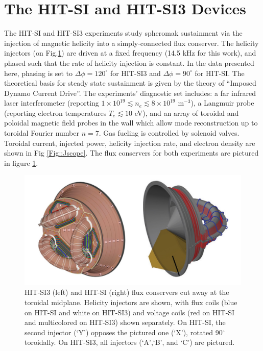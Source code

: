 \section{The HIT-SI and HIT-SI3 Devices}
\hspace{4ex}The HIT-SI\cite{sieck2005initial} and HIT-SI3\cite{Hossack_HitSi3} experiments study spheromak sustainment via the injection of magnetic helicity into a simply-connected flux conserver. The helicity injectors (on Fig.\ref{Fig::V-Tank}) are driven at a fixed frequency (14.5 kHz for this work), and phased such that the rate of helicity injection is constant. In the data presented here, phasing is set to  $\Delta\phi=120^\circ$ for HIT-SI3 and $\Delta\phi=90^\circ$ for HIT-SI. The theoretical basis for steady state sustainment is given by the theory of ``Imposed Dynamo Current Drive''\cite{jarboe2012imposed}. The experiments' diagnostic set includes: a far infrared laser interferometer (reporting $1\times10^{19}\lesssim{n_e}\lesssim8\times10^{19}$  m$^{-3}$)\cite{hossack2013reduction}, a Langmuir probe (reporting electron temperatures $T_e\lesssim10$ eV)\cite{ONeil2007experimental}, and an array of toroidal and poloidal magnetic field probes in the wall which allow mode reconstruction up to toroidal Fourier number $n=7$\cite{Oneil2007overview}. Gas fueling is controlled by solenoid valves. Toroidal current, injected power, helicity injection rate, and electron density are shown in Fig \ref{Fig::Jscope}. The flux conservers for both experiments are pictured in figure \ref{Fig::V-Tank}.
\begin{figure}
\includegraphics[width=6in]{V_Tank}\caption{HIT-SI3 (left) and HIT-SI (right) flux conservers cut away at the toroidal midplane. Helicity injectors are shown, with flux coils (blue on HIT-SI and white on HIT-SI3) and voltage coils (red on HIT-SI and multicolored on HIT-SI3) shown separately. On HIT-SI, the second injector (`Y') opposes the pictured one (`X'), rotated 90$^\circ$ toroidally. On HIT-SI3, all injectors (`A',`B', and `C') are pictured. }\label{Fig::V-Tank}
\end{figure}

